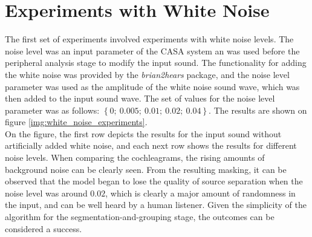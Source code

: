 \section{Experiments with White Noise}

The first set of experiments involved experiments with white noise levels. The noise level was an input parameter of the CASA system an was used before the peripheral analysis stage to modify the input sound. The functionality for adding the white noise was provided by the \textit{brian2hears} \cite{Stimberg2019brian2hears} package, and the noise level parameter was used as the amplitude of the white noise sound wave, which was then added to the input sound wave. The set of values for the noise level parameter was as follows: $\left\{0;~0.005;~0.01;~0.02;~0.04\right\}$. The results are shown on figure \ref{img:white_noise_experiments}.\\

On the figure, the first row depicts the results for the input sound without artificially added white noise, and each next row shows the results for different noise levels. When comparing the cochleagrams, the rising amounts of background noise can be clearly seen. From the resulting masking, it can be observed that the model began to lose the quality of source separation when the noise level was around $0.02$, which is clearly a major amount of randomness in the input, and can be well heard by a human listener. Given the simplicity of the algorithm for the segmentation-and-grouping stage, the outcomes can be considered a success.

